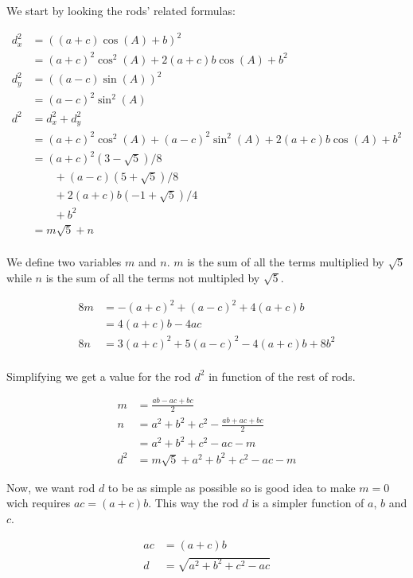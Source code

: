 \documentclass[11pt]{article}
\begin{document}
We start by looking the rods' related formulas:

\begin{align*}
d_x^2 &= ( (a + c)\cos(A) + b)^2 \\
      &= (a + c)^2\cos^2(A) + 2(a + c)b\cos(A) + b^2 \\
d_y^2 &= ( (a - c)\sin(A))^2 \\
      &= (a - c)^2\sin^2(A) \\
d^2 &= d_x^2 + d_y^2 \\
    &= (a + c)^2\cos^2(A)
    + (a - c)^2\sin^2(A)
    + 2(a + c)b\cos(A)
    + b^2 \\
    &= (a + c)^2(3 - \sqrt{5})/8 \\
    &\qquad + (a - c)(5 + \sqrt{5})/8 \\
    &\qquad + 2(a + c)b(-1 + \sqrt{5})/4 \\
    &\qquad + b^2 \\
    &= m\sqrt{5} + n \\
\end{align*}

We define two variables $m$ and $n$. $m$ is the sum of all the terms multiplied by $\sqrt{5}$ while $n$ is the sum of all the terms not multipled by $\sqrt{5}$.

\begin{align*}
8m  &= -(a + c)^2 + (a - c)^2 + 4(a + c)b \\
    &= 4(a + c)b - 4ac \\
8n &= 3(a + c)^2 + 5(a - c)^2 - 4(a + c)b + 8b^2 \\
\end{align*}

Simplifying we get a value for the rod $d^2$ in function of the rest of rods.

\begin{align*}
m  &= \frac{ ab - ac + bc}{2} \\
n  &= a^2 + b^2 + c^2 - \frac{ ab + ac + bc }{2} \\
   &= a^2 + b^2 + c^2 - ac - m \\
d^2 &= m\sqrt{5} + a^2 + b^2 + c^2 - ac - m
\end{align*}

Now, we want rod $d$ to be as simple as possible so is good idea to make $m = 0$ wich requires $ac = (a + c)b$. This way the rod $d$ is a simpler function of $a$, $b$ and $c$.

\begin{align*}
ac &= (a + c)b \\
d &= \sqrt{ a^2 + b^2 + c^2 - ac }
\end{align*}
\end{document}
